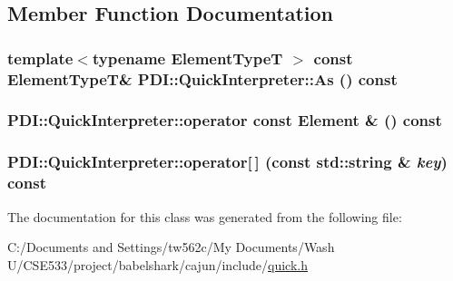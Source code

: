 \subsection{Member Function Documentation}
\hypertarget{class_p_d_i_1_1_quick_interpreter_1b14ba2bcaf09d56517ee187ba8c8af8}{
\subsubsection[{As}]{\setlength{\rightskip}{0pt plus 5cm}template$<$typename ElementTypeT $>$ const ElementTypeT\& PDI::QuickInterpreter::As () const}}
\label{class_p_d_i_1_1_quick_interpreter_1b14ba2bcaf09d56517ee187ba8c8af8}


\hypertarget{class_p_d_i_1_1_quick_interpreter_ba1cde54d9001c045096b16b034925a3}{
\subsubsection[{operator const Element \&}]{\setlength{\rightskip}{0pt plus 5cm}PDI::QuickInterpreter::operator const {\bf Element} \& () const}}
\label{class_p_d_i_1_1_quick_interpreter_ba1cde54d9001c045096b16b034925a3}


\hypertarget{class_p_d_i_1_1_quick_interpreter_4589667715b8352c637e24f7fadfa3b2}{
\subsubsection[{operator[]}]{ PDI::QuickInterpreter::operator\mbox{[}$\,$\mbox{]} (const std::string \& {\em key}) const}}
\label{class_p_d_i_1_1_quick_interpreter_4589667715b8352c637e24f7fadfa3b2}




The documentation for this class was generated from the following file:\begin{CompactItemize}
\item 
C:/Documents and Settings/tw562c/My Documents/Wash U/CSE533/project/babelshark/cajun/include/\hyperlink{quick_8h}{quick.h}\end{CompactItemize}
